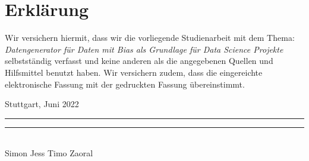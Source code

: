 
\thispagestyle{empty}

\section*{Erklärung}

\vspace*{2em}
Wir versichern hiermit, dass wir die vorliegende Studienarbeit mit dem Thema: \textit{Datengenerator für Daten mit Bias als Grundlage für Data Science Projekte} selbstständig verfasst und keine anderen als die angegebenen Quellen und Hilfsmittel benutzt haben. Wir versichern zudem, dass die eingereichte elektronische Fassung mit der gedruckten Fassung übereinstimmt. 

\vspace{3em}

Stuttgart, Juni 2022
\vspace{3em} \\
\rule{6cm}{0.4pt} \quad \quad \rule{6cm}{0.4pt}\\
Simon Jess \hspace{4.8cm} Timo Zaoral